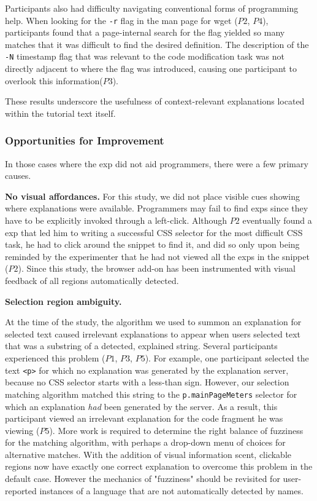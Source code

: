 Participants also had difficulty navigating conventional forms of programming help.
When looking for the \texttt{-r} flag in the man page for wget ($P2$, $P4$), participants found that a page-internal  search for the flag yielded so many matches that it was difficult to find the desired definition.
The description of the \texttt{-N} timestamp flag that was relevant to the code modification task was not directly adjacent to where the flag was introduced, causing one participant to overlook this information($P3$).

These results underscore the usefulness of context-relevant explanations located within the tutorial text itself.

\subsubsection{Opportunities for Improvement}
In those cases where the \gls{exp} did not aid programmers, there were a few primary causes.

{\bf No visual affordances.} For this study, we did not place  visible cues showing where explanations were available.
Programmers may fail to find \glspl{exp} since they have to be explicitly invoked through a left-click.
Although $P2$ eventually found a \gls{exp} that led him to writing a successful CSS selector for the most difficult CSS task, he had to click around the snippet to find it, and did so only upon being reminded by the experimenter that he had not viewed all the \glspl{exp} in the snippet ($P2$).
\fi
Since this study, the browser add-on has been instrumented with visual feedback of all regions automatically detected.

{\bf Selection region ambiguity.}
\begin{changes}
At the time of the study, the algorithm we used to summon an explanation for selected text caused irrelevant explanations to appear when users selected text that was a substring of a detected, explained string.
Several participants experienced this problem ($P1$, $P3$, $P5$).
For example, one participant selected the text \texttt{<p>} for which no explanation was generated by the explanation server, because no CSS selector starts with a less-than sign.
However, our selection matching algorithm matched this string to the \texttt{p.mainPageMeters} selector for which an explanation \emph{had} been generated by the server.
As a result, this participant viewed an irrelevant explanation for the code fragment he was viewing ($P5$).
More work is required to determine the right balance of fuzziness for the matching algorithm, with perhaps a drop-down menu of choices for alternative matches.
\fi
With the addition of visual information scent, clickable regions now have exactly one correct explanation to overcome this problem in the default case.
However the mechanics of "fuzziness" should be revisited for user-reported instances of a language that are not automatically detected by \glspl{name}.
\end{changes}

